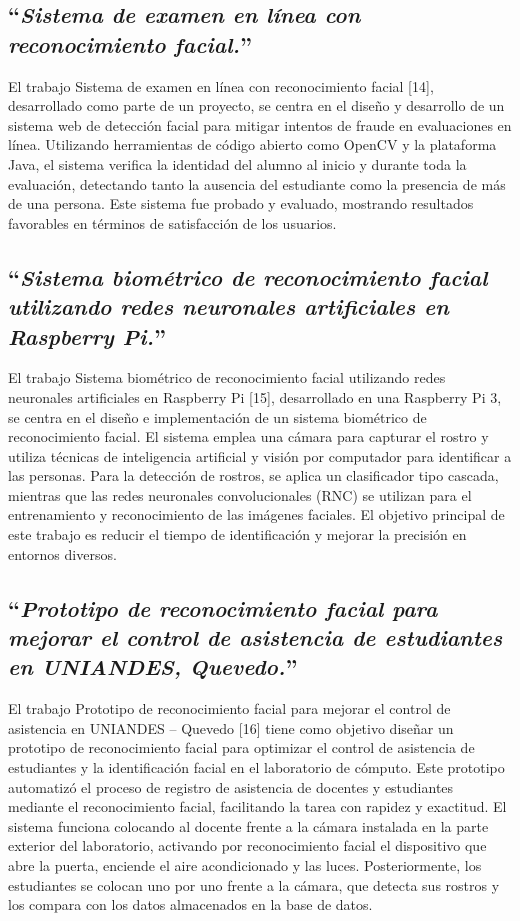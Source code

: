 \subsection{``\textit{Sistema de examen en línea con reconocimiento facial.}''}

El trabajo Sistema de examen en línea con reconocimiento facial [14], desarrollado como parte de un proyecto, se centra en el diseño y desarrollo de un sistema web de detección facial para mitigar intentos de fraude en evaluaciones en línea. Utilizando herramientas de código abierto como OpenCV y la plataforma Java, el sistema verifica la identidad del alumno al inicio y durante toda la evaluación, detectando tanto la ausencia del estudiante como la presencia de más de una persona. Este sistema fue probado y evaluado, mostrando resultados favorables en términos de satisfacción de los usuarios.


\subsection{``\textit{Sistema biométrico de reconocimiento facial utilizando redes neuronales artificiales en Raspberry Pi.}''}

El trabajo Sistema biométrico de reconocimiento facial utilizando redes neuronales artificiales en Raspberry Pi [15], desarrollado en una Raspberry Pi 3, se centra en el diseño e implementación de un sistema biométrico de reconocimiento facial. El sistema emplea una cámara para capturar el rostro y utiliza técnicas de inteligencia artificial y visión por computador para identificar a las personas. Para la detección de rostros, se aplica un clasificador tipo cascada, mientras que las redes neuronales convolucionales (RNC) se utilizan para el entrenamiento y reconocimiento de las imágenes faciales. El objetivo principal de este trabajo es reducir el tiempo de identificación y mejorar la precisión en entornos diversos.

\subsection{``\textit{Prototipo de reconocimiento facial para mejorar el control de asistencia de estudiantes en UNIANDES, Quevedo.}''}

El trabajo Prototipo de reconocimiento facial para mejorar el control de asistencia en UNIANDES – Quevedo [16] tiene como objetivo diseñar un prototipo de reconocimiento facial para optimizar el control de asistencia de estudiantes y la identificación facial en el laboratorio de cómputo. Este prototipo automatizó el proceso de registro de asistencia de docentes y estudiantes mediante el reconocimiento facial, facilitando la tarea con rapidez y exactitud. El sistema funciona colocando al docente frente a la cámara instalada en la parte exterior del laboratorio, activando por reconocimiento facial el dispositivo que abre la puerta, enciende el aire acondicionado y las luces. Posteriormente, los estudiantes se colocan uno por uno frente a la cámara, que detecta sus rostros y los compara con los datos almacenados en la base de datos.

